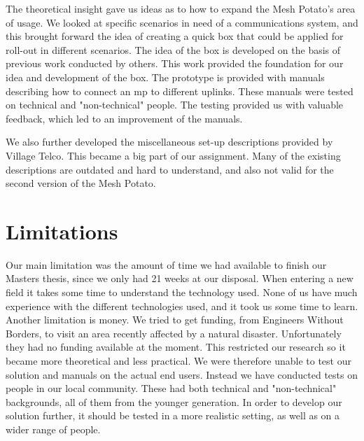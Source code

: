 The theoretical insight gave us ideas as to how to expand the Mesh Potato's area of usage. We looked at specific scenarios in need of a communications system, and this brought forward the idea of creating a \gls{quick} box that could be applied for roll-out in different scenarios. The idea of the box is developed on the basis of previous work conducted by others. This work provided the foundation for our idea and development of the box. The prototype is provided with manuals describing how to connect an \gls{mp} to different uplinks. These manuals were tested on technical and "non-technical" people. The testing provided us with valuable feedback, which led to an improvement of the manuals. 

We also further developed the miscellaneous set-up descriptions provided by Village Telco. This became a big part of our assignment. Many of the existing descriptions are outdated and hard to understand, and also not valid for the second version of the Mesh Potato.



\section{Limitations}
Our main limitation was the amount of time we had available to finish our Masters thesis, since we only had 21 weeks at our disposal. When entering a new field it takes some time to understand the technology used. None of us have much experience with the different technologies used, and it took us some time to learn. Another limitation is money. We tried to get funding, from Engineers Without Borders, to visit an area recently affected by a natural disaster. Unfortunately they had no funding available at the moment. This restricted our research so it became more theoretical and less practical. We were therefore unable to test our solution and manuals on the actual end users. Instead we have conducted tests on people in our local community. These had both technical and "non-technical" backgrounds, all of them from the younger generation. In order to develop our solution further, it should be tested in a more realistic setting, as well as on a wider range of people. 


